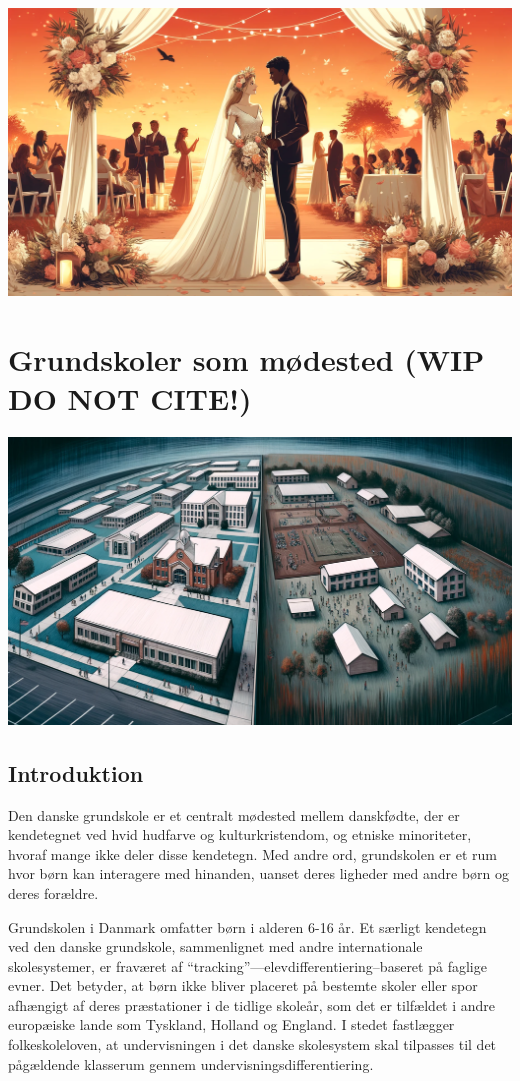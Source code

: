 \documentclass[
]{book}
\begin{document}
\includegraphics[width=1\linewidth]{images/dalle-wedding}

\chapter{\texorpdfstring{Grundskoler som mødested (\textbf{WIP DO NOT CITE!})}{Grundskoler som mødested (WIP DO NOT CITE!)}}\label{kap3}

\includegraphics[width=1\linewidth]{images/dalle-schoolseg}

\section{Introduktion}\label{introduktion}

Den danske grundskole er et centralt mødested mellem danskfødte, der er kendetegnet ved hvid hudfarve og kulturkristendom, og etniske minoriteter, hvoraf mange ikke deler disse kendetegn. Med andre ord, grundskolen er et rum hvor børn kan interagere med hinanden, uanset deres ligheder med andre børn og deres forældre.

Grundskolen i Danmark omfatter børn i alderen 6-16 år. Et særligt kendetegn ved den danske grundskole, sammenlignet med andre internationale skolesystemer, er fraværet af ``tracking''---elevdifferentiering--baseret på faglige evner. Det betyder, at børn ikke bliver placeret på bestemte skoler eller spor afhængigt af deres præstationer i de tidlige skoleår, som det er tilfældet i andre europæiske lande som Tyskland, Holland og England. I stedet fastlægger folkeskoleloven, at undervisningen i det danske skolesystem skal tilpasses til det pågældende klasserum gennem undervisningsdifferentiering.
\end{document}
